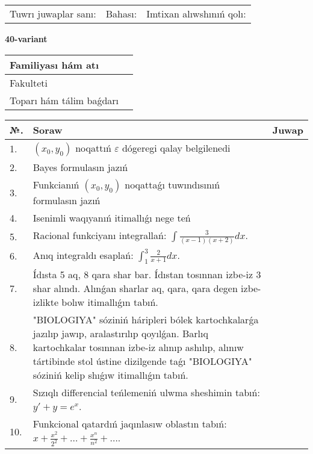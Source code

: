 \documentclass{article}
\begin{document}
\vspace{1cm}

\begin{tabular}{ c c c }
Tuwrı juwaplar sanı: \underline{\hspace{2cm}} & Bahası: \underline{\hspace{2cm}} & Imtixan alıwshınıń qolı: \underline{\hspace{2cm}} \\
\end{tabular}

\newpage

\begin{center}\textbf{40-variant}\end{center}

\bgroup
\def\arraystretch{1.5}
\begin{tabular}{ |m{6cm}|m{10cm}| }
  \hline
  Familiyası hám atı & \\
  \hline
  Fakulteti &\\
  \hline
  Toparı hám tálim baǵdarı & \\
  \hline
\end{tabular}
\egroup

\vspace{0.5cm}

\bgroup
\def\arraystretch{2}
\begin{tabular}{ |l|m{8cm}|m{7cm}| }
  \hline
  №. & Soraw & Juwap \\
  \hline
  1. & $(x_{0} , y_{0})$ noqattıń $\varepsilon$ dógeregi qalay belgilenedi &  \\
  \hline
  2. & Bayes formulasın jazıń &  \\
  \hline
  3. & Funkcianıń $(x_{0}, y_{0})$ noqattaǵı tuwındısınıń formulasın jazıń &  \\
  \hline
  4. & Isenimli waqıyanıń itimallıǵı nege teń &  \\
  \hline
  5. & Racional funkciyanı integrallań: $\displaystyle\int {\frac{3}{(x - 1)(x + 2)}dx}$. &  \\
  \hline
  6. & Anıq integraldı esaplań: $\displaystyle\int_{1}^{3}{\frac{2}{x + 1}dx}$. &  \\
  \hline
  7. & Ídısta 5 aq, 8 qara shar bar. Ídıstan tosınnan izbe-iz 3 shar alındı. Alınǵan sharlar aq, qara, qara degen izbe-izlikte bolıw itimallıǵın tabıń. &  \\
  \hline
  8. & "BIOLOGIYA" sóziniń háripleri bólek kartochkalarǵa jazılıp jawıp, aralastırılıp qoyılǵan. Barlıq kartochkalar tosınnan izbe-iz alınıp ashılıp, alınıw tártibinde stol ústine dizilgende taǵı "BIOLOGIYA" sóziniń kelip shıǵıw itimallıǵın tabıń. &  \\
  \hline
  9. & Sızıqlı differencial teńlemeniń ulwma sheshimin tabıń: $y' + y =e^{x}$. &  \\
  \hline
  10. & Funkcional qatardıń jaqınlasıw oblastın tabıń: $\displaystyle x + \frac{x^{2}}{2^{2}} + \ldots + \frac{x^{n}}{n^{2}} + \ldots$. &  \\
  \hline
\end{tabular}
\egroup
\end{document}

